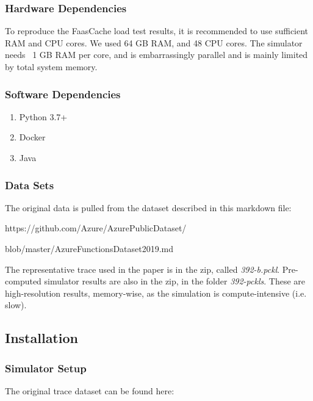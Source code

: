 \subsubsection{Hardware Dependencies}

To reproduce the FaasCache load test results, it is recommended to use sufficient RAM and CPU cores. We used 64 GB RAM, and 48 CPU cores. 
The simulator needs ~1 GB RAM per core, and is embarrassingly parallel and is mainly limited by total system memory. 


\subsubsection{Software Dependencies}

\begin{enumerate}
  \item Python 3.7+
  \item Docker
  \item Java
\end{enumerate}


\subsubsection{Data Sets} \label{data-sets}


The original data is pulled from the dataset described in this markdown file:

\noindent https://github.com/Azure/AzurePublicDataset/

blob/master/AzureFunctionsDataset2019.md

The representative trace used in the paper is in the zip, called {\em 392-b.pckl}.
Pre-computed simulator results are also in the zip, in the folder {\em 392-pckls}. 
These are high-resolution results, memory-wise, as the simulation is compute-intensive (i.e. slow).

\subsection{Installation}

\subsubsection{Simulator Setup}


\noindent The original trace dataset can be found here:

